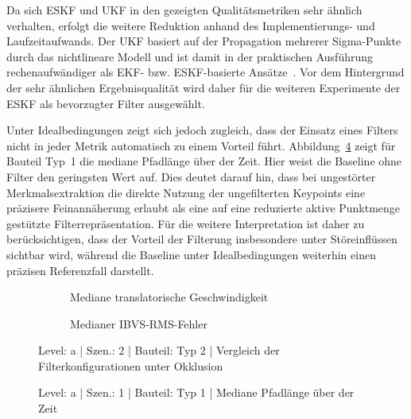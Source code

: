 Da sich \ac{ESKF} und \ac{UKF} in den gezeigten Qualitätsmetriken sehr ähnlich verhalten, erfolgt die weitere Reduktion anhand des Implementierungs- und Laufzeitaufwands. Der \ac{UKF} basiert auf der Propagation mehrerer Sigma-Punkte durch das nichtlineare Modell und ist damit in der praktischen Ausführung rechenaufwändiger als \ac{EKF}- bzw. \ac{ESKF}-basierte Ansätze~\cite{julier1997new,wan2000ukf}. Vor dem Hintergrund der sehr ähnlichen Ergebnisqualität wird daher für die weiteren Experimente der \ac{ESKF} als bevorzugter Filter ausgewählt.

Unter Idealbedingungen zeigt sich jedoch zugleich, dass der Einsatz eines Filters nicht in jeder Metrik automatisch zu einem Vorteil führt. Abbildung~\ref{fig:a_1_Typ1_timeseries_median_path_length} zeigt für Bauteil Typ~1 die mediane Pfadlänge über der Zeit. Hier weist die Baseline ohne Filter den geringsten Wert auf. Dies deutet darauf hin, dass bei ungestörter Merkmalsextraktion die direkte Nutzung der ungefilterten Keypoints eine präzisere Feinannäherung erlaubt als eine auf eine reduzierte aktive Punktmenge gestützte Filterrepräsentation. Für die weitere Interpretation ist daher zu berücksichtigen, dass der Vorteil der Filterung insbesondere unter Störeinflüssen sichtbar wird, während die Baseline unter Idealbedingungen weiterhin einen präzisen Referenzfall darstellt.

\begin{figure}[htbp]
    \centering
    \begin{subfigure}[b]{0.49\textwidth}
        \caption{Mediane translatorische Geschwindigkeit}
        \label{fig:a_2_Typ2_timeseries_median_ibvs_lin_vel_l2}
    \end{subfigure}
    \hfill
    \begin{subfigure}[b]{0.49\textwidth}
        \caption{Medianer \ac{IBVS}-RMS-Fehler}
        \label{fig:a_2_Typ2_timeseries_median_ibvs_rms_px}
    \end{subfigure}
    \caption{Level: a | Szen.: 2 | Bauteil: Typ 2 | Vergleich der Filterkonfigurationen unter Okklusion}
    \label{fig:a_2_typ2_filterauswahl}
\end{figure}

\begin{figure}[htbp]
    \centering
    \caption{Level: a | Szen.: 1 | Bauteil: Typ 1 | Mediane Pfadlänge über der Zeit}
    \label{fig:a_1_Typ1_timeseries_median_path_length}
\end{figure}

